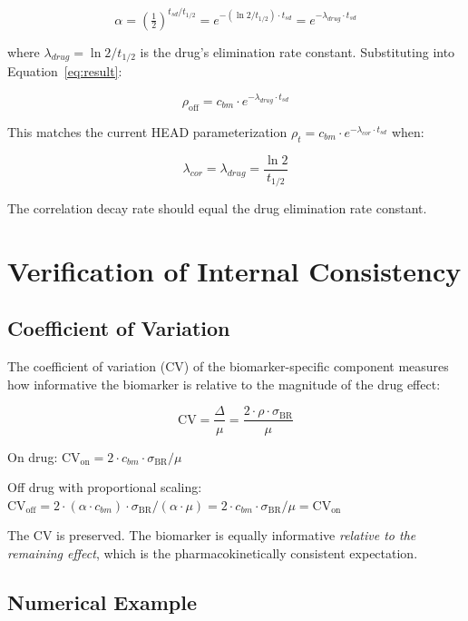 \documentclass[11pt]{article}
\begin{document}
\[
\alpha = \left(\tfrac{1}{2}\right)^{t_{sd}/t_{1/2}}
= e^{-(\ln 2 / t_{1/2}) \cdot t_{sd}}
= e^{-\lambda_{drug} \cdot t_{sd}}
\]

where $\lambda_{drug} = \ln 2 / t_{1/2}$ is the drug's
elimination rate constant. Substituting into
Equation~\ref{eq:result}:

\[
\rho_{\text{off}} = c_{bm} \cdot
  e^{-\lambda_{drug} \cdot t_{sd}}
\]

This matches the current HEAD parameterization
$\rho_t = c_{bm} \cdot e^{-\lambda_{cor} \cdot t_{sd}}$
when:

\begin{equation}
\boxed{\lambda_{cor} = \lambda_{drug} = \frac{\ln 2}{t_{1/2}}}
\label{eq:lambda}
\end{equation}

The correlation decay rate should equal the drug elimination
rate constant.

\section{Verification of Internal Consistency}

\subsection{Coefficient of Variation}

The coefficient of variation (CV) of the biomarker-specific
component measures how informative the biomarker is relative
to the magnitude of the drug effect:

\[
\text{CV} = \frac{\Delta}{\mu} =
\frac{2 \cdot \rho \cdot \sigma_{\text{BR}}}{\mu}
\]

On drug: $\text{CV}_{\text{on}} = 2 \cdot c_{bm} \cdot
\sigma_{\text{BR}} / \mu$

Off drug with proportional scaling:
$\text{CV}_{\text{off}} = 2 \cdot (\alpha \cdot c_{bm})
\cdot \sigma_{\text{BR}} / (\alpha \cdot \mu)
= 2 \cdot c_{bm} \cdot \sigma_{\text{BR}} / \mu
= \text{CV}_{\text{on}}$

The CV is preserved. The biomarker is equally informative
\emph{relative to the remaining effect}, which is the
pharmacokinetically consistent expectation.

\subsection{Numerical Example}
\end{document}
